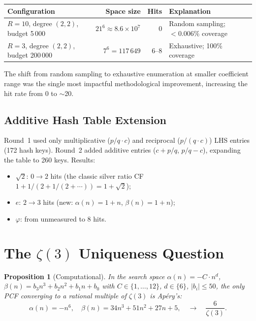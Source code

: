 \documentclass[11pt,a4paper]{article}
\newtheorem{proposition}[theorem]{Proposition}
\begin{document}
\begin{center}
\renewcommand{\arraystretch}{1.1}
\begin{tabular}{@{}lrrl@{}}
\toprule
\textbf{Configuration} & \textbf{Space size} & \textbf{Hits} & \textbf{Explanation} \\
\midrule
$R=10$, degree $(2,2)$, budget 5\,000 & $21^6 \approx 8.6\times10^7$ & 0 &
  Random sampling; $< 0.006\%$ coverage \\
$R=3$, degree $(2,2)$, budget 200\,000 & $7^6 = 117\,649$ & 6--8 &
  Exhaustive; 100\% coverage \\
\bottomrule
\end{tabular}
\end{center}

\noindent
The shift from random sampling to exhaustive enumeration at smaller
coefficient range was the single most impactful methodological
improvement, increasing the hit rate from 0 to $\sim$20.

\subsection{Additive Hash Table Extension}

Round~1 used only multiplicative ($p/q \cdot c$) and reciprocal
($p/(q\cdot c)$) LHS entries (172 hash keys).
Round~2 added additive entries ($c + p/q$, $p/q - c$), expanding
the table to 260 keys.  Results:
\begin{itemize}[leftmargin=1.5em]
\item $\sqrt{2}$: $0 \to 2$ hits (the classic silver ratio CF
      $1 + 1/(2 + 1/(2 + \cdots)) = 1+\sqrt{2}$);
\item $e$: $2 \to 3$ hits (new: $\alpha(n)=1+n$, $\beta(n)=1+n$);
\item $\varphi$: from unmeasured to 8 hits.
\end{itemize}

\section{The $\zeta(3)$ Uniqueness Question}

\begin{proposition}[Computational]
In the search space $\alpha(n) = -C\cdot n^d$, $\beta(n) = b_3 n^3 + b_2 n^2
+ b_1 n + b_0$ with $C \in \{1,\ldots,12\}$, $d \in \{6\}$,
$|b_i| \le 50$, the only PCF converging to a rational multiple of
$\zeta(3)$ is Ap\'ery's:
\[
\alpha(n) = -n^6, \quad
\beta(n) = 34n^3 + 51n^2 + 27n + 5,
\quad\longrightarrow\quad \frac{6}{\zeta(3)}.
\]
\end{proposition}
\end{document}

